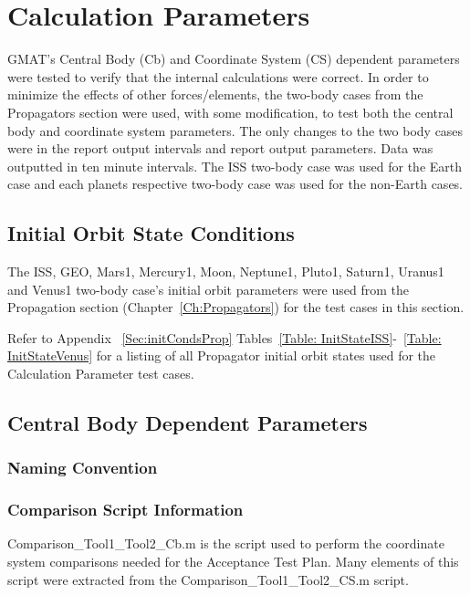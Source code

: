\chapter{Calculation Parameters}
\label{Ch:CalcParameters}

GMAT's Central Body (Cb) and Coordinate System
(CS) dependent parameters were tested to verify that the
internal calculations were correct. In order to minimize the effects
of other forces/elements, the two-body cases from the Propagators
section were used, with some modification, to test both the central
body and coordinate system parameters. The only changes to the two
body cases were in the report output intervals and report output
parameters. Data was outputted in ten minute intervals. The
ISS two-body case was used for the Earth case and each
planets respective two-body case was used for the non-Earth cases.

\section{Initial Orbit State Conditions}
The ISS, GEO, Mars1, Mercury1, Moon, Neptune1,
Pluto1, Saturn1, Uranus1 and Venus1 two-body case's initial orbit
parameters were used from the Propagation section
(Chapter~\ref{Ch:Propagators}) for the test cases in this section.

Refer to Appendix ~\ref{Sec:initCondsProp} Tables~\ref{Table:
InitStateISS}-~\ref{Table: InitStateVenus} for a listing of all
Propagator initial orbit states used for the Calculation Parameter
test cases.

\section{Central Body Dependent Parameters}
\subsection{Naming Convention}
\label{nameConvCb}


\subsection{Comparison Script Information}
Comparison\_Tool1\_Tool2\_Cb.m is the script used to perform the
coordinate system comparisons needed for the Acceptance Test Plan.
Many elements of this script were extracted from the
Comparison\_Tool1\_Tool2\_CS.m script.

